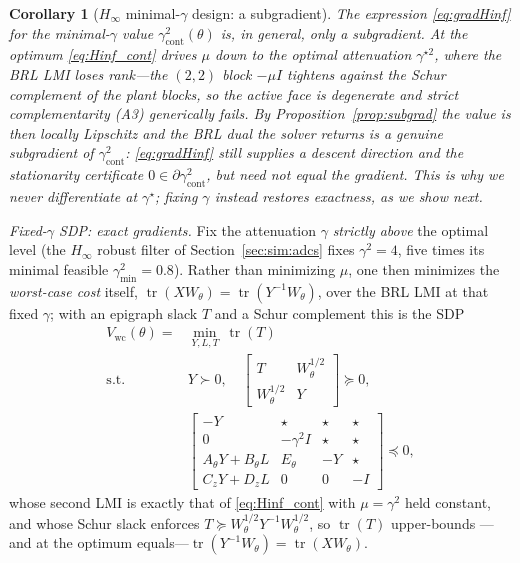 \documentclass[twocolumn,amsthm]{autart}
\newtheorem{corollary}{Corollary}
\begin{document}
\begin{corollary}[$H_\infty$ minimal-$\gamma$ design: a subgradient]\label{cor:hinf}
The expression \eqref{eq:gradHinf} for the minimal-$\gamma$ value
$\gamma^2_{\mathrm{cont}}(\theta)$ is, in general, only a \emph{subgradient}. At the
optimum \eqref{eq:Hinf_cont} drives $\mu$ down to the optimal attenuation
$\gamma^{\star 2}$, where the BRL LMI loses rank---the $(2,2)$ block $-\mu I$ tightens
against the Schur complement of the plant blocks, so the active face is degenerate and
strict complementarity (A3) generically fails. By Proposition~\ref{prop:subgrad} the
value is then locally Lipschitz and the BRL dual the solver returns is a genuine
subgradient of $\gamma^2_{\mathrm{cont}}$: \eqref{eq:gradHinf} still supplies a descent
direction and the stationarity certificate $0\in\partial\gamma^2_{\mathrm{cont}}$, but
need not equal the gradient. This is why we never differentiate at $\gamma^\star$;
fixing $\gamma$ instead restores exactness, as we show next.
\end{corollary}

\emph{Fixed-$\gamma$ SDP: exact gradients.} Fix the attenuation $\gamma$
\emph{strictly above} the optimal level (the $H_\infty$ robust filter of
Section~\ref{sec:sim:adcs} fixes $\gamma^2=4$, five times its minimal feasible
$\gamma^2_{\min}=0.8$). Rather than minimizing $\mu$, one then
minimizes the \emph{worst-case cost} itself,
$\operatorname{tr}(XW_\theta)=\operatorname{tr}(Y^{-1}W_\theta)$, over the BRL LMI at
that fixed $\gamma$; with an epigraph slack $T$ and a Schur complement this is the SDP
\begin{equation}\label{eq:Hinf_fixed}
\begin{aligned}
V_{\mathrm{wc}}(\theta)=&\min_{Y,L,T}\ \operatorname{tr}(T)\\
\text{s.t. } & Y\succ0,\quad
\begin{bmatrix} T & W_\theta^{1/2}\\ W_\theta^{1/2} & Y\end{bmatrix}\succeq0,\\
& \begin{bmatrix}
-Y & \star & \star & \star \\
0 & -\gamma^2 I & \star & \star \\
A_\theta Y + B_\theta L & E_\theta & -Y & \star \\
C_z Y + D_z L & 0 & 0 & -I
\end{bmatrix} \preceq 0,
\end{aligned}
\end{equation}
whose second LMI is exactly that of \eqref{eq:Hinf_cont} with $\mu=\gamma^2$ held
constant, and whose Schur slack enforces
$T\succeq W_\theta^{1/2}Y^{-1}W_\theta^{1/2}$, so $\operatorname{tr}(T)$ upper-bounds
---and at the optimum equals---$\operatorname{tr}(Y^{-1}W_\theta)=\operatorname{tr}(XW_\theta)$.
\end{document}
